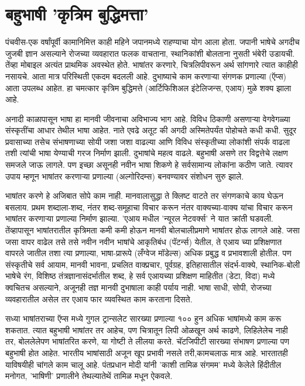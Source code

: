 \chapter{बहुभाषी 'कृत्रिम बुद्धिमत्ता'}

पंचवीस-एक वर्षांपूर्वी कामानिमित्त काही महिने जपानमध्ये राहण्याचा योग आला होता. जपानी भाषेचे अगदीच जुजबी ज्ञान असल्याने रोजच्या व्यवहारात फलक वाचताना, स्थानिकांशी बोलताना नुसती भंबेरी उडायची. तेंव्हा मोबाइल अत्यंत प्राथमिक अवस्थेत होते. भाषांतर करणारे, चित्रलिपीवरून अर्थ सांगणारे त्यात काहीही नसायचे. आता मात्र परिस्थिती एकदम बदलली आहे. दुभाष्याचे काम करणाऱ्या संगणक प्रणाल्या (ऍप्स) आता उपलब्ध आहेत. हा चमत्कार कृत्रिम बुद्धिमत्ते (आर्टिफिशिअल इंटेलिजन्स, एआय) मुळे शक्य झाला आहे.

अनादी काळापासून भाषा हा मानवी जीवनाचा अविभाज्य भाग आहे. विविध ठिकाणी असणाऱ्या वेगवेगळ्या संस्कृतींचा आधार तेथील भाषा आहेत. नाते एवढे अतूट की अगदी अस्मितेपर्यंत पोहोचते कधी कधी. सुदूर प्रवासाच्या तसेच संभाषणाच्या सोयी जशा जशा वाढल्या आणि विविध संस्कृतीच्या लोकांशी संपर्क वाढला तशी त्यांची भाषा येण्याची गरज निर्माण झाली. दुभाषांचे महत्व वाढले. बहुभाषी असणे तर विद्वत्तेचे लक्षण समजले जाऊ लागले. पण इच्छा असूनही नवीन भाषा शिकणे हे सर्वसामान्य लोकांना कठीण जाते. त्यावर उपाय म्हणून भाषांतर करणाऱ्या प्रणाल्या (अल्गोरिदम्स) बनवण्यावर संशोधन सुरु झाले.

भाषांतर करणे हे अजिबात सोपे काम नाही. मानवालासुद्धा ते क्लिष्ट वाटते तर संगणकाचे काय घेऊन बसलाय. प्रथम शब्दाला-शब्द, नंतर शब्द-समूहाचा विचार करून नंतर वाक्यच्या-वाक्य यांचा विचार करून भाषांतर करणाऱ्या प्रणाल्या निर्माण झाल्या. 'एआय मधील 'न्यूरल नेटवर्क्स' ने यात क्रांती घडवली. तेंव्हापासून भाषांतरातील कृत्रिमता कमी कमी होऊन मानवी बोलचालीप्रमाणे भाषांतर होऊ लागले आहे. जसा जसा वापर वाढेल तसे तसे नवीन नवीन भाषांचे आकृतिबंध (पॅटर्न्स) येतील, ते एआय च्या प्रशिक्षणात वापरले जातील तशा त्या प्रणाल्या, भाषा-प्रारूपे (लँग्वेज मॉडेल्स) अधिक प्रबुद्ध व प्रभावशाली होतील. पण संस्कृतीचे सर्व आयाम, मानवी भावना, प्रचलित वाक्प्रचार, पूर्वग्रह, इतिहासातील संदर्भ-वाक्ये, स्थानिक-बोली भाषेचे रंग, विशिष्ठ तंत्रज्ञानासंदर्भातील शब्द, हे सर्व एआयच्या प्रशिक्षण माहितीत (डेटा, विदा) मध्ये क्वचितच असल्याने, अजूनही तज्ञ मानवी दुभाषाला काही पर्याय नाही. भाषा साधी, सोपी, रोजच्या व्यवहारातील असेल तर एआय फार व्यवस्थित काम करताना दिसते.

सध्या भाषांतराच्या ऍप्स मध्ये गुगल ट्रान्सलेट सारख्या प्रणाल्या १०० हुन अधिक भाषांमध्ये काम करू शकतात. त्यात बहुभाषी भाषांतर तर आहेच, पण चित्रातून लिपी ओळखून अर्थ काढणे, लिहिलेलेच नाही तर, बोललेलेपण भाषांतरित करणे, या गोष्टी ते लीलया करते. चॅटजिपीटी सारख्या संभाषण प्रणाल्या पण बहुभाषी होत आहेत. भारतीय भाषांसाठी अजून खूप प्रभावी नसले तरी,कामचलाऊ मात्र आहे. भारतातही याविषयीही चांगले काम चालू आहे. पंतप्रधान मोदी यांनी 'काशी तामिळ संगमम' मध्ये केलेले हिंदीतील मनोगत, 'भाषिणी' प्रणालीने तेथल्यातेथें तामिळ मधून ऐकवले.

